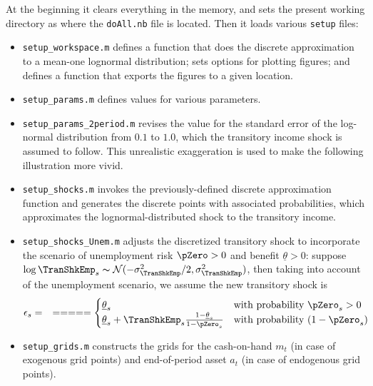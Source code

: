 \documentclass[titlepage,abstract]{\econtex}
\providecommand{\thetaMin}{\underline{\theta}}
\begin{document}
At the beginning it clears everything in the memory, and sets the present working directory as where the \texttt{doAll.nb} file is located. Then it loads various \texttt{setup} files:
\begin{itemize}
      \item \texttt{setup\_workspace.m} defines a function that does the discrete approximation to a mean-one lognormal distribution; sets options for plotting figures; and defines a function that exports the figures to a given location.
      \item \texttt{setup\_params.m} defines values for various parameters.
      \item \texttt{setup\_params\_2period.m} revises the value for the standard error of the log-normal distribution from $0.1$ to $1.0$, which the transitory income shock is assumed to follow. This unrealistic exaggeration is used to make the following illustration more vivid.
      \item \texttt{setup\_shocks.m} invokes the previously-defined discrete approximation function and generates the discrete points with associated probabilities, which approximates the lognormal-distributed shock to the transitory income.
      \item \texttt{setup\_shocks\_Unem.m} adjusts the discretized transitory shock to incorporate the scenario of unemployment risk $\pZero>0$ and benefit $\thetaMin>0$: suppose $\log \TranShkEmp_{s}\thicksim \mathcal{N}(-\sigma_{\TranShkEmp}^{2}/2, \sigma_{\TranShkEmp}^{2})$, then taking into account of the unemployment scenario, we assume the new transitory shock is
          \begin{equation}\begin{gathered}\begin{aligned}
          \epsilon_{s}      &=& =  =  =  =  =  
          \begin{cases}
            \thetaMin_{s} & \text{with probability $\pZero_{s}>0$} \\
            \thetaMin_{s} + \TranShkEmp_{s}\frac{1-\thetaMin_{s}}{1-\pZero_{s}}  & \text{with probability $(1-\pZero_{s})$}
          \end{cases}
          \end{aligned}\end{gathered}\end{equation}
      \item \texttt{setup\_grids.m} constructs the grids for the cash-on-hand $m_{t}$ (in case of exogenous grid points) and end-of-period asset $a_{t}$ (in case of endogenous grid points).

\end{itemize}
\end{document}
